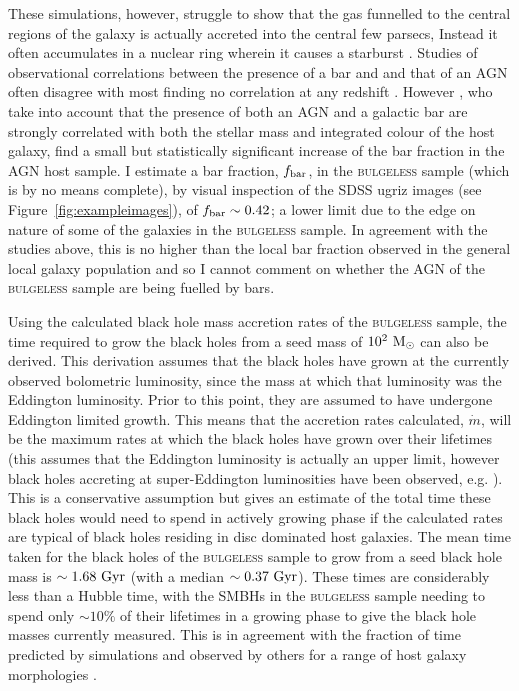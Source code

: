 {These simulations, however, struggle to show that the gas funnelled to the central regions of the galaxy is actually accreted into the central few parsecs, Instead it often accumulates in a nuclear ring wherein it causes a starburst \citep{regan04}. Studies of observational correlations between the presence of a bar and and that of an AGN often disagree with most finding no correlation at any redshift \citep{ho97, malkan98, erwin02, lee12,cisternas13, cheung15}. However \cite{galloway15}, who take into account that the presence of both an AGN and a galactic bar are strongly correlated with both the stellar mass and integrated colour of the host galaxy, find a small but statistically significant increase of the bar fraction in the AGN host sample. I estimate a bar fraction, $f_{\rm{bar}}$, in the \textsc{bulgeless} sample (which is by no means complete), by visual inspection of the SDSS ugriz images (see Figure~\ref{fig:exampleimages}), of $f_{\rm{bar}} \sim 0.42$; a lower limit due to the edge on nature of some of the galaxies in the \textsc{bulgeless} sample. In agreement with the studies above, this is no higher than the local bar fraction observed in the general local galaxy population \citep{masters11a} and so I cannot comment on whether the AGN of the \textsc{bulgeless} sample are being fuelled by bars.

Using the calculated black hole mass accretion rates of the \textsc{bulgeless} sample, the time required to grow the black holes from a seed mass of $10^2 ~\rm{M}_{\odot}$ \citep{volonteri08} can also be derived. This derivation assumes that the black holes have grown at the currently observed bolometric luminosity, since the mass at which that luminosity was the Eddington luminosity. Prior to this point, they are assumed to have undergone Eddington limited growth. This means that the accretion rates calculated, $\dot{m}$, will be the maximum rates at which the black holes have grown over their lifetimes (this assumes that the Eddington luminosity is actually an upper limit, however black holes accreting at super-Eddington luminosities have been observed, e.g. \citealt{lanzuisi16, pintore16, soria16}). This is a conservative assumption but gives an estimate of the total time these black holes would need to spend in actively growing phase if the calculated rates are typical of black holes residing in disc dominated host galaxies. The mean time taken for the black holes of the \textsc{bulgeless} sample to grow from a seed black hole mass is $\sim 1.68 ~\rm{Gyr}$ (with a median $\sim 0.37 ~\rm{Gyr}$). These times are considerably less than a Hubble time, with the SMBHs in the \textsc{bulgeless} sample needing to spend only $\sim 10\%$ of their lifetimes in a growing phase to give the black hole masses currently measured. This is in agreement with the fraction of time predicted by simulations and observed by others for a range of host galaxy morphologies \citep{kauffmann03, hao05, hopkins06, fiore12, Simmons13}.

}
